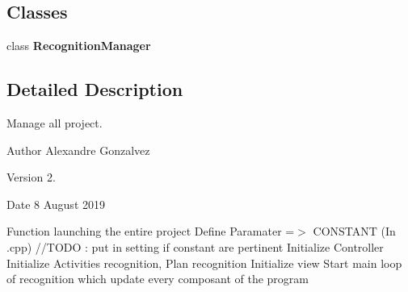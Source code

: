 \subsection*{Classes}
\begin{DoxyCompactItemize}
\item 
class \textbf{ Recognition\+Manager}
\end{DoxyCompactItemize}


\subsection{Detailed Description}
Manage all project. 

\begin{DoxyAuthor}{Author}
Alexandre Gonzalvez 
\end{DoxyAuthor}
\begin{DoxyVersion}{Version}
2. 
\end{DoxyVersion}
\begin{DoxyDate}{Date}
8 August 2019
\end{DoxyDate}
Function launching the entire project Define Paramater =$>$ C\+O\+N\+S\+T\+A\+NT (In .cpp) //\+T\+O\+DO \+: put in setting if constant are pertinent Initialize Controller Initialize Activities recognition, Plan recognition Initialize view Start main loop of recognition which update every composant of the program 